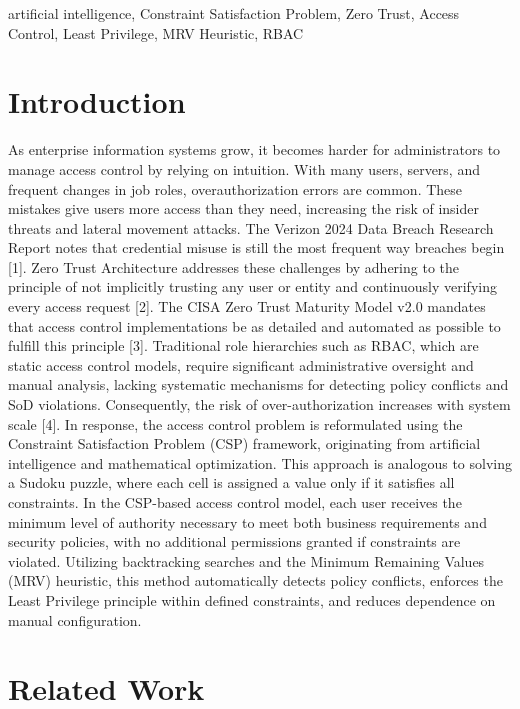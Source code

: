 \documentclass[conference]{IEEEtran}
\begin{document}
	\begin{IEEEkeywords}
		artificial intelligence, Constraint Satisfaction Problem, Zero Trust, Access Control, Least Privilege, MRV Heuristic, RBAC
	\end{IEEEkeywords}
	
	\section{Introduction}
	\label{sec:introduction}
	
	As enterprise information systems grow, it becomes harder for administrators to manage access control by relying on intuition. With many users, servers, and frequent changes in job roles, overauthorization errors are common. These mistakes give users more access than they need, increasing the risk of insider threats and lateral movement attacks. The Verizon 2024 Data Breach Research Report notes that credential misuse is still the most frequent way breaches begin [1].
Zero Trust Architecture addresses these challenges by adhering to the principle of not implicitly trusting any user or entity and continuously verifying every access request [2]. The CISA Zero Trust Maturity Model v2.0 mandates that access control implementations be as detailed and automated as possible to fulfill this principle [3]. Traditional role hierarchies such as RBAC, which are static access control models, require significant administrative oversight and manual analysis, lacking systematic mechanisms for detecting policy conflicts and SoD violations. Consequently, the risk of over-authorization increases with system scale [4]. In response, the access control problem is reformulated using the Constraint Satisfaction Problem (CSP) framework, originating from artificial intelligence and mathematical optimization. This approach is analogous to solving a Sudoku puzzle, where each cell is assigned a value only if it satisfies all constraints. In the CSP-based access control model, each user receives the minimum level of authority necessary to meet both business requirements and security policies, with no additional permissions granted if constraints are violated. Utilizing backtracking searches and the Minimum Remaining Values (MRV) heuristic, this method automatically detects policy conflicts, enforces the Least Privilege principle within defined constraints, and reduces dependence on manual configuration.


	
	\section{Related Work}
	\label{sec:related_work}
	
\end{document}
